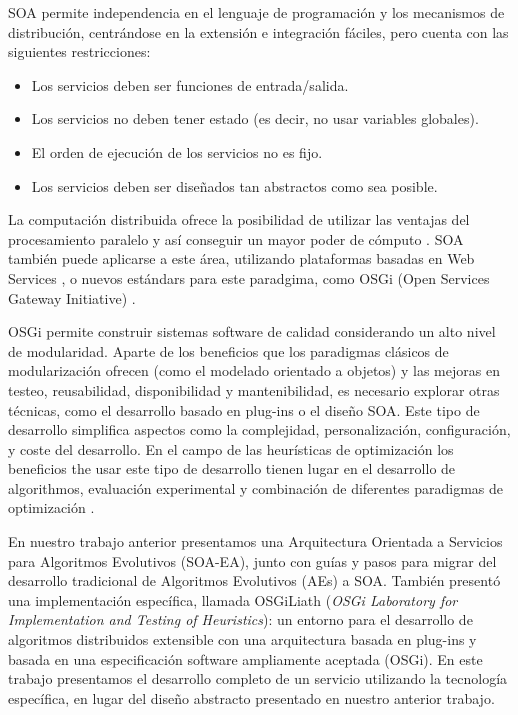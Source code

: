 \documentclass[runningheads]{llncs}
\begin{document}
SOA permite independencia en el lenguaje de programación y los mecanismos de distribución, centrándose en la extensión e integración fáciles, pero cuenta con las siguientes restricciones:

\begin{itemize}
\item Los servicios deben ser funciones de entrada/salida.
\item Los servicios no deben tener estado (es decir, no usar variables globales).
\item El orden de ejecución de los servicios no es fijo.
\item Los servicios deben ser diseñados tan abstractos como sea posible.
\end{itemize}

La computación distribuida ofrece la posibilidad de utilizar las ventajas del procesamiento paralelo y así conseguir un mayor poder de cómputo \cite{OPENSCIENCEGRID}.
SOA también puede aplicarse a este área, utilizando plataformas basadas en Web Services \cite{PAPAZOGLOU}, o nuevos estándars para este paradgima, como OSGi (Open Services Gateway Initiative) \cite{OSGI}.

OSGi permite construir sistemas software de calidad considerando un alto nivel de modularidad. Aparte de los beneficios que los paradigmas clásicos de modularización ofrecen (como el modelado orientado a objetos) y las mejoras en testeo, reusabilidad, disponibilidad y mantenibilidad, es necesario explorar otras técnicas, como el desarrollo basado en plug-ins o el diseño SOA. Este tipo de desarrollo simplifica aspectos como la complejidad, personalización, configuración, y coste del desarrollo. En el campo de las heurísticas de optimización los beneficios the usar este tipo de desarrollo tienen lugar en el desarrollo de algorithmos, evaluación experimental y combinación de diferentes paradigmas de optimización \cite{PLUGINS}.


En nuestro trabajo anterior \cite{OSGILIATH} presentamos una Arquitectura Orientada a Servicios para Algoritmos Evolutivos (SOA-EA), junto con guías y pasos para migrar del desarrollo tradicional de Algoritmos Evolutivos (AEs) a SOA. También presentó una implementación específica, llamada OSGiLiath ({\em OSGi Laboratory for Implementation and Testing of Heuristics}): un entorno para el desarrollo de algoritmos distribuidos extensible con una arquitectura basada en plug-ins y basada en una especificación software ampliamente aceptada (OSGi). En este trabajo presentamos el desarrollo completo de un servicio utilizando la tecnología específica, en lugar del diseño abstracto presentado en nuestro anterior trabajo.
\end{document}
